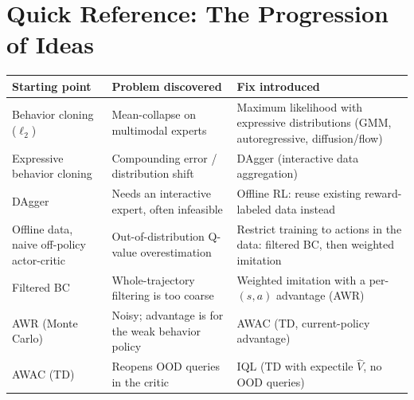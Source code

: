\documentclass[11pt]{article}
\begin{document}
\section{Quick Reference: The Progression of Ideas}

\begin{center}
\begin{tabular}{@{}p{3.4cm}p{4.6cm}p{4.6cm}@{}}
\toprule
Starting point & Problem discovered & Fix introduced \\
\midrule
Behavior cloning ($\ell_2$) & Mean-collapse on multimodal experts & Maximum likelihood
with expressive distributions (GMM, autoregressive, diffusion/flow) \\
Expressive behavior cloning & Compounding error / distribution shift & DAgger
(interactive data aggregation) \\
DAgger & Needs an interactive expert, often infeasible & Offline RL: reuse existing
reward-labeled data instead \\
Offline data, naive off-policy actor-critic & Out-of-distribution Q-value
overestimation & Restrict training to actions in the data: filtered BC, then weighted
imitation \\
Filtered BC & Whole-trajectory filtering is too coarse & Weighted imitation with a
per-$(s,a)$ advantage (AWR) \\
AWR (Monte Carlo) & Noisy; advantage is for the weak behavior policy & AWAC (TD,
current-policy advantage) \\
AWAC (TD) & Reopens OOD queries in the critic & IQL (TD with expectile $\hat V$,
no OOD queries) \\
\bottomrule
\end{tabular}
\end{center}
\end{document}
